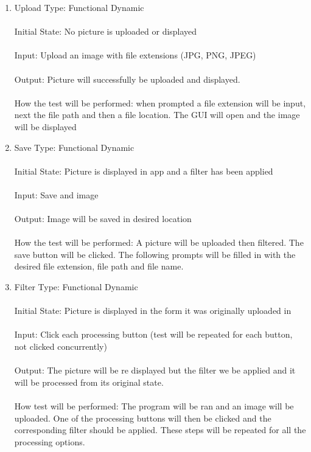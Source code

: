 \documentclass[12pt, titlepage]{article}
\begin{document}
\begin{enumerate}

\item{Upload}
Type: Functional Dynamic \\ \\
Initial State: No picture is uploaded or displayed \\ \\
Input: Upload an image with file extensions (JPG, PNG, JPEG) \\ \\
Output: Picture will successfully be uploaded and displayed. \\ \\
How the test will be performed: when prompted a file extension will be input, next the file path and then a file location. The GUI will open and the image will be displayed

\item{Save}
Type: Functional Dynamic \\ \\
Initial State: Picture is displayed in app and a filter has been applied \\ \\
Input: Save and image \\ \\
Output: Image will be saved in desired location \\ \\
How the test will be performed: A picture will be uploaded then filtered. The save button will be clicked. The following prompts will be filled in with the desired file extension, file path and file name.

\item{Filter}
Type: Functional Dynamic\\ \\
Initial State: Picture is displayed in the form it was originally uploaded in\\ \\
Input: Click each processing button (test will be repeated for each button, not clicked concurrently)\\ \\
Output: The picture will be re displayed but the filter we be applied and it will be processed from its original state. \\ \\
How test will be performed: The program will be ran and an image will be uploaded. One of the processing buttons will then be clicked and the corresponding filter should be applied. These steps will be repeated for all the processing options.


\end{enumerate}
\end{document}

